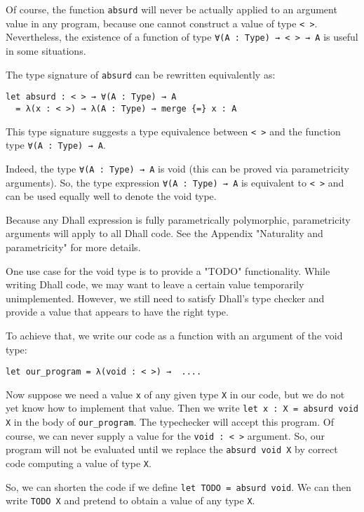 Of course, the function \lstinline!absurd! will never be actually applied to an argument value in any program, because one cannot construct a value of type \lstinline!< >!.
Nevertheless, the existence of a function of type \lstinline!∀(A : Type) → < > → A! is useful in some situations.


The type signature of \lstinline!absurd! can be rewritten equivalently as:


\begin{lstlisting}[language=Dhall]
let absurd : < > → ∀(A : Type) → A
  = λ(x : < >) → λ(A : Type) → merge {=} x : A 
\end{lstlisting}


This type signature suggests a type equivalence between \lstinline!< >! and the function type \lstinline!∀(A : Type) → A!.


Indeed, the type \lstinline!∀(A : Type) → A! is void (this can be proved via parametricity arguments).
So, the type expression \lstinline!∀(A : Type) → A! is equivalent to \lstinline!< >! and can be used equally well to denote the void type.


Because any Dhall expression is fully parametrically polymorphic, parametricity arguments will apply to all Dhall code.
See the Appendix "Naturality and parametricity" for more details.


One use case for the void type is to provide a "TODO" functionality.
While writing Dhall code, we may want to leave a certain value temporarily unimplemented.
However, we still need to satisfy Dhall's type checker and provide a value that appears to have the right type.


To achieve that, we write our code as a function with an argument of the void type:


\begin{lstlisting}[language=Dhall]
let our_program = λ(void : < >) →  .... 
\end{lstlisting}


Now suppose we need a value \lstinline!x! of any given type \lstinline!X! in our code, but we do not yet know how to implement that value.
Then we write \lstinline!let x : X = absurd void X! in the body of \lstinline!our_program!.
The typechecker will accept this program.
Of course, we can never supply a value for the \lstinline!void : < >! argument.
So, our program will not be evaluated until we replace the \lstinline!absurd void X! by correct code computing a value of type \lstinline!X!.


So, we can shorten the code if we define \lstinline!let TODO = absurd void!.
We can then write \lstinline!TODO X! and pretend to obtain a value of any type \lstinline!X!.


